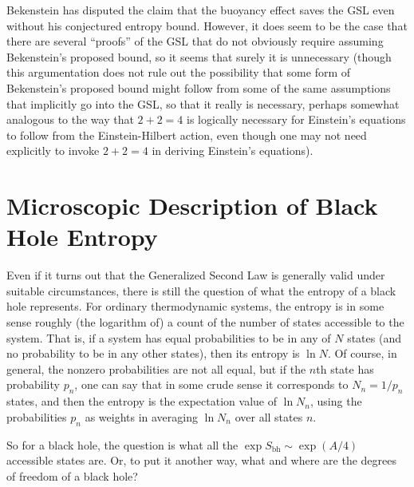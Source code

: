 \documentclass[12pt]{article} \usepackage{latexsym}
\begin{document}
Bekenstein \cite{Bek6,Bek7,Bek8} has disputed the claim that the
buoyancy effect saves the GSL even without his conjectured entropy
bound.  However, it does seem to be the case that there are several
``proofs'' of the GSL that do not obviously require assuming
Bekenstein's proposed bound, so it seems that surely it is unnecessary
(though this argumentation does not rule out the possibility that some
form of Bekenstein's proposed bound might follow from some of the same
assumptions that implicitly go into the GSL, so that it really is
necessary, perhaps somewhat analogous to the way that $2+2=4$ is
logically necessary for Einstein's equations to follow from the
Einstein-Hilbert action, even though one may not need explicitly to
invoke $2+2=4$ in deriving Einstein's equations).

\section{Microscopic Description of Black Hole Entropy}

Even if it turns out that the Generalized Second Law is generally
valid under suitable circumstances, there is still the question of
what the entropy of a black hole represents.  For ordinary
thermodynamic systems, the entropy is in some sense roughly (the
logarithm of) a count of the number of states accessible to the
system.  That is, if a system has equal probabilities to be in any of
$N$ states (and no probability to be in any other states), then its
entropy is $\ln{N}$.  Of course, in general, the nonzero probabilities
are not all equal, but if the $n$th state has probability $p_n$, one
can say that in some crude sense it corresponds to $N_n = 1/p_n$
states, and then the entropy is the expectation value of $\ln{N_n}$,
using the probabilities $p_n$ as weights in averaging $\ln{N_n}$ over
all states $n$.

So for a black hole, the question is what all the
$\exp{S_{\mathrm{bh}}} \sim \exp{(A/4)}$ accessible states are.  Or,
to put it another way, what and where are the degrees of freedom of a
black hole?
\end{document}
